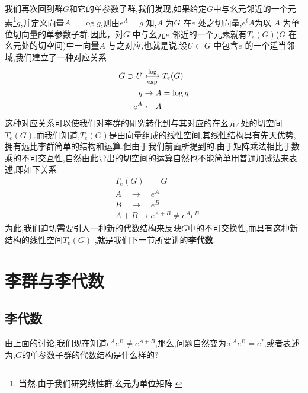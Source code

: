 我们再次回到群$G$和它的单参数子群,我们发现,如果给定$G$中与幺元邻近的一个元素\footnote{当然,由于我们研究线性群,幺元为单位矩阵.}$g$,并定义向量$A=\log g$,则由$e^A=g$ 知,$A$ 为$G$ 在$e$ 处之切向量,$e^tA$为以 $A$ 为单位切向量的单参数子群.因此，对$G$ 中与幺元$e$ 邻近的一个元素就有$T_{e}(G)$($G$ 在幺元处的切空间)中一向量$A$ 与之对应,也就是说,设$U\subset G$ 中包含$e$ 的一个适当邻域,我们建立了一种对应关系
\begin{equation}
	\begin{aligned}
		G\supset U&\overunderset{\log}{\exp}{\longleftrightarrow}T_{e}(G)\\g&\to A=\log g\\e^{A}&\leftarrow A
	\end{aligned}
\end{equation}
这种对应关系可以使我们对李群的研究转化到与其对应的在幺元$e$处的切空间$T_e(G)$.而我们知道,$T_e(G)$是由向量组成的线性空间,其线性结构具有先天优势,拥有远比李群简单的结构和运算.但由于我们前面所提到的,由于矩阵乘法相比于数乘的不可交互性,自然由此导出的切空间的运算自然也不能简单用普通加减法来表述,即如下关系
\begin{equation}
	\begin{aligned}&T_{e}(G)\qquad G\\&A\quad\longrightarrow\quad e^{A}\\&B\quad\longrightarrow\quad e^{B}\\&A+B\to e^{A+B}\ne e^{A}e^{B}\end{aligned}
\end{equation}
为此,我们迫切需要引入一种新的代数结构来反映$G$中的不可交换性,而具有这种新结构的线性空间$T_e(G)$
,就是我们下一节所要讲的\textbf{李代数}.
\section{李群与李代数}
\subsection{李代数}
由上面的讨论,我们现在知道$e^Ae^B\ne e^{A+B}$,那么,问题自然变为:$e^Ae^B=e^{?}$,或者表述为,$G$的单参数子群的代数结构是什么样的?

